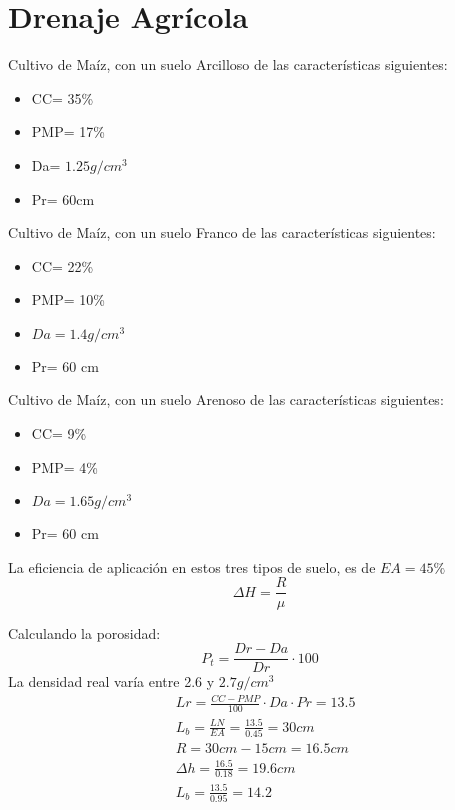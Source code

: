 \chapter{Drenaje Agrícola}

Cultivo de Maíz, con un suelo Arcilloso de las características siguientes:
\begin{itemize}
    \item CC= 35\%
    \item PMP= 17\%
    \item Da= $1.25 g/cm^3$
    \item Pr= 60cm
\end{itemize}

Cultivo de Maíz, con un suelo Franco de las características siguientes:
\begin{itemize}
    \item CC= 22\%
    \item PMP= 10\%
    \item $Da= 1.4 g/cm^3$
    \item Pr= 60 cm
\end{itemize}

Cultivo de Maíz, con un suelo Arenoso de las características siguientes:
\begin{itemize}
    \item CC= 9\%
    \item PMP= 4\%
    \item $Da= 1.65 g/cm^3$
    \item Pr= 60 cm
\end{itemize}

La eficiencia de aplicación en estos tres tipos de suelo, es de $EA=45\%$
\begin{equation}
    \Delta H= \frac{R}{\mu}
\end{equation}

Calculando la porosidad:
\begin{equation}
    P_t = \frac{Dr - Da}{Dr} \cdot 100
\end{equation}
La densidad real varía entre 2.6 y $2.7 g/cm^3$
\begin{align*}
    &Lr = \frac{CC - PMP}{100} \cdot Da \cdot Pr = 13.5\\
    &L_b =\frac{LN}{EA} = \frac{13.5}{0.45}= 30cm\\
    &R = 30cm - 15cm = 16.5cm\\
    &\Delta h = \frac{16.5}{0.18} = 19.6cm\\
    &L_b = \frac{13.5}{0.95}= 14.2
\end{align*}

